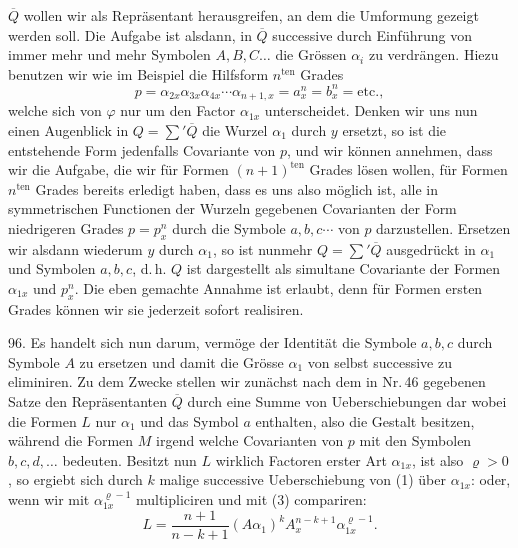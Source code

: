 $\overline{Q}$ wollen wir als Repräsentant herausgreifen, an dem die Umformung gezeigt werden soll. Die Aufgabe ist alsdann, in $\overline{Q}$ successive durch Einführung von immer mehr und mehr Symbolen $A, B, C\ldots$ die Grössen $\alpha_i$ zu verdrängen. Hiezu benutzen wir wie im Beispiel die Hilfsform $n^{\text{ten}}$ Grades
\[
p = \alpha_{2x}\alpha_{3x}\alpha_{4x}\cdots\alpha_{n+1,x} = a_x^n = b_x^n = \text{etc.},
\]
welche sich von $\varphi$ nur um den Factor $\alpha_{1x}$ unterscheidet. Denken wir uns nun einen Augenblick in $Q = \sum{}' \overline{Q}$ die Wurzel $\alpha_1$ durch $y$ ersetzt, so ist die entstehende Form jedenfalls Covariante von $p$, und wir können annehmen, dass wir die Aufgabe, die wir für Formen $(n+1)^{\text{ten}}$ Grades lösen wollen, für Formen $n^{\text{ten}}$ Grades bereits erledigt haben, dass es uns also möglich ist, alle in symmetrischen Functionen der Wurzeln gegebenen Covarianten der Form niedrigeren Grades $p = p_x^n$ durch die Symbole $a, b, c\cdots$ von $p$ darzustellen. Ersetzen wir alsdann wiederum $y$ durch $\alpha_1$, so ist nunmehr $Q = \sum{}' \overline{Q}$ ausgedrückt in $\alpha_1$ und Symbolen $a, b, c$, d.\,h. $Q$ ist dargestellt als simultane Covariante der Formen $\alpha_{1x}$ und $p_x^n$. Die eben gemachte Annahme ist erlaubt, denn für Formen ersten Grades können wir sie jederzeit sofort realisiren.

96. Es handelt sich nun darum, vermöge der Identität
die Symbole $a, b, c$ durch Symbole $A$ zu ersetzen und damit die Grösse $\alpha_1$ von selbst successive zu eliminiren. Zu dem Zwecke stellen wir zunächst nach dem in Nr.\,46 gegebenen Satze den Repräsentanten $\overline{Q}$ durch eine Summe von Ueberschiebungen dar
wobei die Formen $L$ nur $\alpha_1$ und das Symbol $a$ enthalten, also die Gestalt
besitzen, während die Formen $M$ irgend welche Covarianten von $p$ mit den Symbolen $b, c, d,\ldots$ bedeuten. Besitzt nun $L$ wirklich Factoren erster Art $\alpha_{1x}$, ist also $\varrho > 0$, so ergiebt sich durch $k$ malige successive Ueberschiebung von (1) über $\alpha_{1x}$:
oder, wenn wir mit $\alpha_{1x}^{\varrho-1}$ multipliciren und mit (3) compariren:
\[
L = \frac{n+1}{n-k+1}(A\alpha_1)^k A_x^{n-k+1}\alpha_{1x}^{\varrho-1}.
\]


